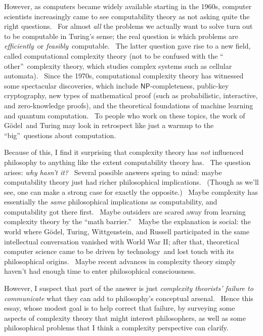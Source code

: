 \documentclass[11pt,onecolumn]{article}%
\begin{document}
However, as computers became widely available starting in the 1960s, computer
scientists increasingly came to see computability theory as not asking quite
the right questions. \ For almost \textit{all} the problems we actually want
to solve turn out to be computable in Turing's sense; the real question is
which problems are \textit{efficiently}\ or \textit{feasibly}\ computable.
\ The latter question gave rise to a new field, called computational
complexity theory (not to be confused with the \textquotedblleft
other\textquotedblright\ complexity theory, which studies complex systems such
as cellular automata). \ Since the 1970s, computational complexity theory has
witnessed some spectacular discoveries, which include $\mathsf{NP}%
$-completeness, public-key cryptography, new types of mathematical proof (such
as probabilistic, interactive, and zero-knowledge proofs), and the theoretical
foundations of machine learning and quantum computation. \ To people who work
on these topics, the work of G\"{o}del\ and Turing may look in retrospect like
just a warmup to the \textquotedblleft big\textquotedblright\ questions about computation.

Because of this, I find it surprising that complexity theory has \textit{not}
influenced philosophy to anything like the extent computability theory has.
\ The question arises: \textit{why hasn't it?} \ Several possible answers
spring to mind: maybe computability theory just had richer philosophical
implications. \ (Though as we'll see, one can make a strong case for exactly
the opposite.) \ Maybe complexity has essentially the \textit{same}
philosophical implications as computability, and computability got there
first. \ Maybe outsiders are scared away from learning complexity theory by
the \textquotedblleft math barrier.\textquotedblright\ \ Maybe the explanation
is social: the world where G\"{o}del, Turing, Wittgenstein, and Russell
participated in the same intellectual conversation vanished with World War II;
after that, theoretical computer science came to be driven by technology\ and
lost touch with its philosophical origins. \ Maybe recent advances in
complexity theory simply haven't had enough time to enter philosophical consciousness.

However, I suspect that part of the answer is just \textit{complexity
theorists' failure to communicate} what they can add to philosophy's
conceptual arsenal. \ Hence this essay, whose modest goal is to help correct
that failure, by surveying some aspects of complexity theory that might
interest philosophers, as well as some philosophical problems that I think a
complexity perspective can clarify.
\end{document}
